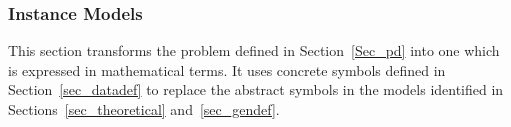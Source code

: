 \documentclass[12pt]{article}
\newcommand{\colAwidth}{0.13\textwidth}
\newcommand{\colBwidth}{0.82\textwidth}
\begin{document}




\subsubsection{Instance Models} \label{sec_instance}    


This section transforms the problem defined in Section~\ref{Sec_pd} into 
one which is expressed in mathematical terms. It uses concrete symbols defined 
in Section~\ref{sec_datadef} to replace the abstract symbols in the models 
identified in Sections~\ref{sec_theoretical} and~\ref{sec_gendef}.

\end{document}

